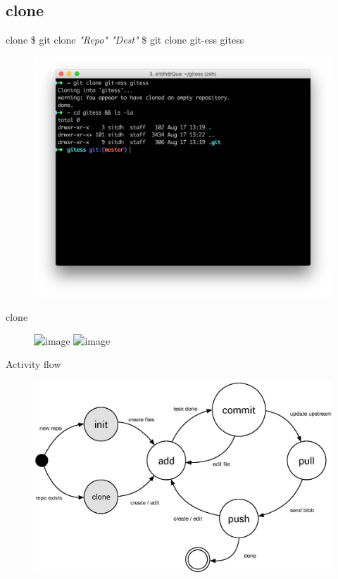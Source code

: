\documentclass{beamer}
\begin{document}
\subsection[clone]{clone}
\begin{frame}{clone}
    \Large{\$ git clone \em{"Repo" "Dest"}} \newline
    \Large{\$ git clone git-ess gitess}
    \begin{figure}
        \center
        \includegraphics[width=.9\textwidth]{git-clone}
        \label{fig:git-clone}
    \end{figure}
\end{frame}

\begin{frame}{clone}
    \begin{figure}
        \center
        \includegraphics<1>[width=.7\textwidth]{git-clone-action-0}
        \includegraphics<2>[width=.7\textwidth]{git-clone-action-1}
    \end{figure}
\end{frame}

\begin{frame}{Activity flow}
    \begin{figure}
        \center
        \includegraphics[width=.9\textwidth]{git-command-flow-1}
        \label{fig:git-command-flow-1}
    \end{figure}
\end{frame}
\end{document}
